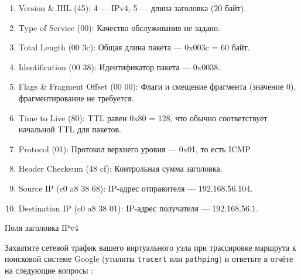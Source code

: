 \begin{enumerate}
	\item Version \& IHL (45): 4 --- IPv4, 5 --- длина заголовка (20 байт).
	\item Type of Service (00): Качество обслуживания не задано.
	\item Total Length (00 3c): Общая длина пакета --- 0x003c = 60 байт.
	\item Identification (00 38): Идентификатор пакета --- 0x0038.
	\item Flags \& Fragment Offset (00 00):
		Флаги и смещение фрагмента (значение 0), фрагментирование не требуется.
	\item Time to Live (80):
		TTL равен 0x80 = 128,
		что обычно соответствует начальной TTL для пакетов.
	\item Protocol (01): Протокол верхнего уровня --- 0x01, то есть ICMP.
	\item Header Checksum (48 cf): Контрольная сумма заголовка.
	\item Source IP (c0 a8 38 68): IP-адрес отправителя --- 192.168.56.104.
	\item Destination IP (c0 a8 38 01): IP-адрес получателя --- 192.168.56.1.
\end{enumerate}

\begin{image}
	\caption{Поля заголовка IPv4}
	\label{fig:wrsh:ipv4:txt}
\end{image}

Захватите сетевой трафик вашего виртуального узла
при трассировке маршрута к поисковой системе Google
(утилиты \texttt{tracert} или \texttt{pathping})
и ответьте в отчёте на следующие вопросы :

